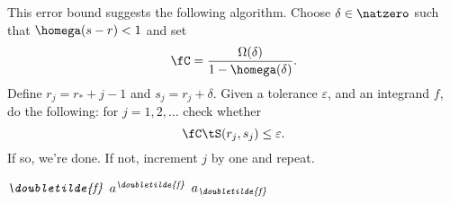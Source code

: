 \documentclass[]{elsarticle}
\newcommand{\fudge}{\fC}
\newcommand{\dtf}{\textit{\doubletilde{f}}}
\theoremstyle{definition}
\theoremstyle{remark}
\begin{document}
This error bound suggests the following algorithm.  Choose $\delta \in \natzero$ such that $\homega(s-r)<1$ and set
\[
\fudge = \frac{\Omega(\delta)}{1 - \homega(\delta)}.
\]
Define $r_j=r_*+j-1$ and $s_j=r_j+\delta$.  Given a tolerance $\varepsilon$, and an integrand $f$, do the following:  for $j=1, 2, \ldots$ check whether
\[
\fudge \tS(r_j,s_j) \le \varepsilon.
\]
If so, we're done.  If not, increment $j$ by one and repeat.


$\dtf$ $a^{\dtf}$ $a_{\dtf}$


\end{document}
